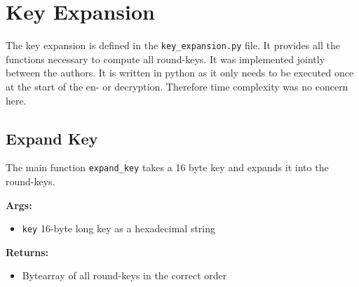 \section{Key Expansion}
\label{ch:key_expansion}
The key expansion is defined in the \lstinline{key_expansion.py} file. It provides all the functions necessary to compute all round-keys. It was implemented jointly between the authors. It is written in python as it only needs to be executed once at the start of the en- or decryption. Therefore time complexity was no concern here.

\subsection{Expand Key}
\label{ch:expand_key}
The main function  \lstinline{expand_key} takes a 16 byte key and expands it into the round-keys.

\textbf{Args:}
\begin{itemize}
  \item \lstinline{key} 16-byte long key as a hexadecimal string
\end{itemize}

\textbf{Returns:}
\begin{itemize}
  \item Bytearray of all round-keys in the correct order
\end{itemize}

